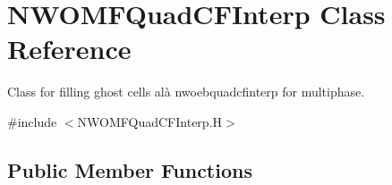 \hypertarget{classNWOMFQuadCFInterp}{}\section{N\+W\+O\+M\+F\+Quad\+C\+F\+Interp Class Reference}
\label{classNWOMFQuadCFInterp}


Class for filling ghost cells alà nwoebquadcfinterp for multiphase.  




{\ttfamily \#include $<$N\+W\+O\+M\+F\+Quad\+C\+F\+Interp.\+H$>$}

\subsection*{Public Member Functions}
